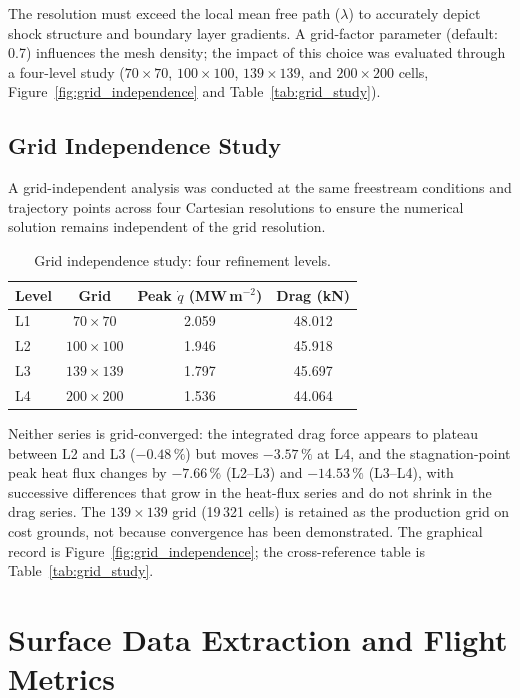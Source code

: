 The resolution must exceed the local mean free path ($\lambda$) to accurately depict shock structure and boundary layer gradients. A grid-factor parameter (default: 0.7) influences the mesh density; the impact of this choice was evaluated through a four-level study ($70\times70$, $100\times100$, $139\times139$, and $200\times200$ cells, Figure~\ref{fig:grid_independence} and Table~\ref{tab:grid_study}).

\subsection{Grid Independence Study}
A grid-independent analysis was conducted at the same freestream conditions and trajectory points across four Cartesian resolutions to ensure the numerical solution remains independent of the grid resolution.

\begin{table}[H]
    \centering
    \caption{Grid independence study: four refinement levels.}
    \label{tab:mesh_independence}
    \begin{tabular}{|l|c|c|c|}
        \hline
        \textbf{Level} & \textbf{Grid} & \textbf{Peak $\dot q$ (MW\,m$^{-2}$)} & \textbf{Drag (kN)} \\ \hline
        L1 & $70\times70$ & 2.059 & 48.012 \\ \hline
        L2 & $100\times100$ & 1.946 & 45.918 \\ \hline
        L3 & $139\times139$ & 1.797 & 45.697 \\ \hline
        L4 & $200\times200$ & 1.536 & 44.064 \\ \hline
    \end{tabular}
\end{table}

Neither series is grid-converged: the integrated drag force appears to plateau between L2 and L3 ($-0.48\,\%$) but moves $-3.57\,\%$ at L4, and the stagnation-point peak heat flux changes by $-7.66\,\%$ (L2--L3) and $-14.53\,\%$ (L3--L4), with successive differences that grow in the heat-flux series and do not shrink in the drag series. The $139\times139$ grid (19\,321 cells) is retained as the production grid on cost grounds, not because convergence has been demonstrated. The graphical record is Figure~\ref{fig:grid_independence}; the cross-reference table is Table~\ref{tab:grid_study}.

\section{Surface Data Extraction and Flight Metrics}

